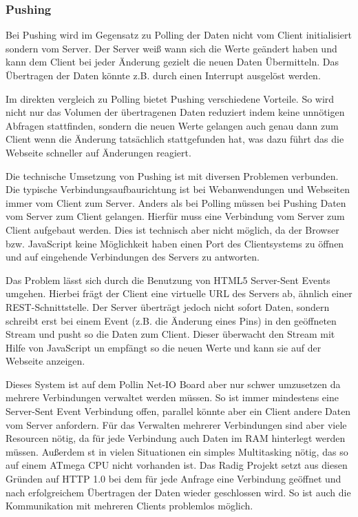 \subsubsection{Pushing}
Bei Pushing wird im Gegensatz zu Polling der Daten nicht vom Client initialisiert sondern
vom Server. Der Server weiß wann sich die Werte geändert haben und kann dem Client bei
jeder Änderung gezielt die neuen Daten Übermitteln. Das Übertragen der Daten könnte z.B.
durch einen Interrupt ausgelöst werden.

Im direkten vergleich zu Polling bietet Pushing verschiedene Vorteile. So wird nicht nur
das Volumen der übertragenen Daten reduziert indem keine unnötigen Abfragen stattfinden,
sondern die neuen Werte gelangen auch genau dann zum Client wenn die Änderung tatsächlich
stattgefunden hat, was dazu führt das die Webseite schneller auf Änderungen reagiert.

Die technische Umsetzung von Pushing ist mit diversen Problemen verbunden. Die typische
Verbindungsaufbaurichtung ist bei Webanwendungen und Webseiten immer vom Client zum
Server. Anders als bei Polling müssen bei Pushing Daten vom Server zum Client gelangen.
Hierfür muss eine Verbindung vom Server zum Client aufgebaut werden. Dies ist technisch
aber nicht möglich, da der Browser bzw. JavaScript keine Möglichkeit haben einen Port des
Clientsystems zu öffnen und auf eingehende Verbindungen des Servers zu antworten.

Das Problem lässt sich durch die Benutzung von HTML5 Server-Sent Events umgehen. Hierbei
frägt der Client eine virtuelle URL des Servers ab, ähnlich einer REST-Schnittstelle. Der
Server überträgt jedoch nicht sofort Daten, sondern schreibt erst bei einem Event (z.B.
die Änderung eines Pins) in den geöffneten Stream und pusht so die Daten zum Client.
Dieser überwacht den Stream mit Hilfe von JavaScript un empfängt so die neuen Werte und
kann sie auf der Webseite anzeigen.

Dieses System ist auf dem Pollin Net-IO Board aber nur schwer umzusetzen da mehrere
Verbindungen verwaltet werden müssen. So ist immer mindestens eine Server-Sent Event
Verbindung offen, parallel könnte aber ein Client andere Daten vom Server anfordern. Für
das Verwalten mehrerer Verbindungen sind aber viele Resourcen nötig, da für jede
Verbindung auch Daten im RAM hinterlegt werden müssen. Außerdem st in vielen Situationen
ein simples Multitasking nötig, das so auf einem ATmega CPU nicht vorhanden ist. Das Radig
Projekt setzt aus diesen Gründen auf HTTP 1.0 bei dem für jede Anfrage eine Verbindung
geöffnet und nach erfolgreichem Übertragen der Daten wieder geschlossen wird. So ist auch
die Kommunikation mit mehreren Clients problemlos möglich.

